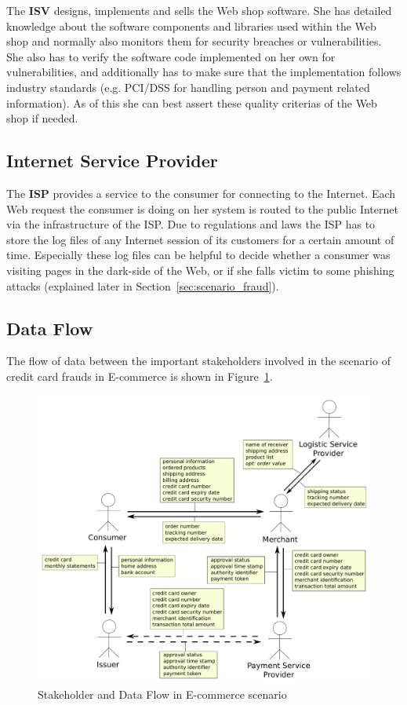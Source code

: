 The \textbf{ISV} designs, implements and sells the Web shop software. She has detailed knowledge about the software components and libraries used within the Web shop and normally also monitors them for security breaches or vulnerabilities. She also has to verify the software code implemented on her own for vulnerabilities, and additionally has to make sure that the implementation follows industry standards (e.g. PCI/DSS for handling person and payment related information). As of this she can best assert these quality criterias of the Web shop if needed.


\subsection{Internet Service Provider}
\label{subsec:stakeholder_isp}

The \textbf{ISP} provides a service to the consumer for connecting to the Internet. Each Web request the consumer is doing on her system is routed to the public Internet via the infrastructure of the \gls{ISP}. Due to regulations and laws the \gls{ISP} has to store the log files of any Internet session of its customers for a certain amount of time. Especially these log files can be helpful to decide whether a consumer was visiting pages in the dark-side of the Web, or if she falls victim to some phishing attacks (explained later in Section~\ref{sec:scenario_fraud}).


\subsection{Data Flow}
\label{subsec:stakeholder_data_flow}

The flow of data between the important stakeholders involved in the scenario of credit card frauds in E-commerce is shown in Figure~\ref{fig:images_e_commerce_stakeholder}. \@

\begin{figure}[H]
	\centering
		\includegraphics[width=0.8\columnwidth]{images/e-commerce-stakeholder.pdf}
	\caption{Stakeholder and Data Flow in E-commerce scenario}
\label{fig:images_e_commerce_stakeholder}
\end{figure}


